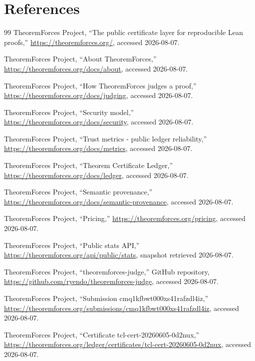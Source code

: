 \documentclass[a4paper,11pt]{ltjsarticle}
\begin{document}
\section*{References}

\begin{thebibliography}{99}
TheoremForces Project,
``The public certificate layer for reproducible Lean proofs,''
\url{https://theoremforces.org/}, accessed 2026-08-07.

TheoremForces Project,
``About TheoremForces,''
\url{https://theoremforces.org/docs/about}, accessed 2026-08-07.

TheoremForces Project,
``How TheoremForces judges a proof,''
\url{https://theoremforces.org/docs/judging}, accessed 2026-08-07.

TheoremForces Project,
``Security model,''
\url{https://theoremforces.org/docs/security}, accessed 2026-08-07.

TheoremForces Project,
``Trust metrics - public ledger reliability,''
\url{https://theoremforces.org/docs/metrics}, accessed 2026-08-07.

TheoremForces Project,
``Theorem Certificate Ledger,''
\url{https://theoremforces.org/docs/ledger}, accessed 2026-08-07.

TheoremForces Project,
``Semantic provenance,''
\url{https://theoremforces.org/docs/semantic-provenance}, accessed 2026-08-07.

TheoremForces Project,
``Pricing,''
\url{https://theoremforces.org/pricing}, accessed 2026-08-07.

TheoremForces Project,
``Public stats API,''
\url{https://theoremforces.org/api/public/stats}, snapshot retrieved 2026-08-07.

TheoremForces Project,
``theoremforces-judge,'' GitHub repository,
\url{https://github.com/ryendo/theoremforces-judge}, accessed 2026-08-07.

TheoremForces Project,
``Submission cmq1kfbwt000xs41rafzdl4iz,''
\url{https://theoremforces.org/submissions/cmq1kfbwt000xs41rafzdl4iz}, accessed 2026-08-07.

TheoremForces Project,
``Certificate tcl-cert-20260605-0d2nux,''
\url{https://theoremforces.org/ledger/certificates/tcl-cert-20260605-0d2nux}, accessed 2026-08-07.


\end{thebibliography}
\end{document}
